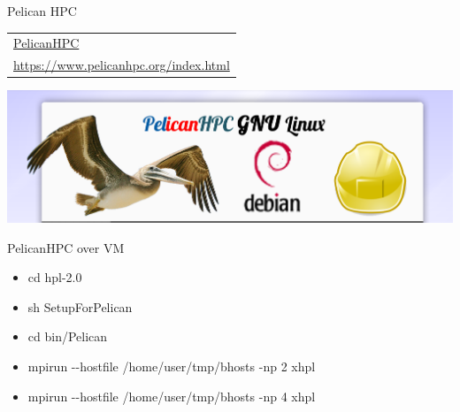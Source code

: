 \documentclass[ignorenonframetext,]{beamer}
\providecommand{\tightlist}{%
  \setlength{\itemsep}{0pt}\setlength{\parskip}{0pt}}
\begin{document}
\begin{frame}{Pelican HPC}

\begin{longtable}[]{@{}l@{}}
\toprule
\endhead
\href{https://www.pelicanhpc.org/index.html}{PelicanHPC}\tabularnewline
\url{https://www.pelicanhpc.org/index.html}\tabularnewline
\bottomrule
\end{longtable}

\includegraphics{images/PelicanHPC.png}

\end{frame}

\begin{frame}{PelicanHPC over VM}

\begin{itemize}
\tightlist
\item
  cd hpl-2.0
\item
  sh SetupForPelican
\item
  cd bin/Pelican
\item
  mpirun -\/-hostfile /home/user/tmp/bhosts -np 2 xhpl
\item
  mpirun -\/-hostfile /home/user/tmp/bhosts -np 4 xhpl
\end{itemize}


\end{frame}
\end{document}
